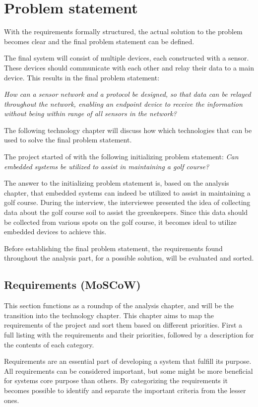 \chapter{Problem statement}
With the requirements formally structured, the actual solution to the problem becomes clear and the final problem statement can be defined.

The final system will consist of multiple devices, each constructed with a sensor. These devices should communicate with each other and relay their data to a main device. This results in the final problem statement:

\textit{How can a sensor network and a protocol be designed, so that data can be relayed throughout the network, enabling an endpoint device to receive the information without being within range of all sensors in the network?}

The following technology chapter will discuss how which technologies that can be used to solve the final problem statement.

The project started of with the following initializing problem statement:
\textit{Can embedded systems be utilized to assist in maintaining a golf course?}

The answer to the initializing problem statement is, based on the analysis chapter, that embedded systems can indeed be utilized to assist in maintaining a golf course. During the interview, the interviewee presented the idea of collecting data about the golf course soil to assist the greenkeepers. Since this data should be collected from various spots on the golf course, it becomes ideal to utilize embedded devices to achieve this.

Before establishing the final problem statement, the requirements found throughout the analysis part, for a possible solution, will be evaluated and sorted.

\section{Requirements (MoSCoW)}
This section functions as a roundup of the analysis chapter, and will be the transition into the technology chapter. This chapter aims to map the requirements of the project and sort them based on different priorities. First a full listing with the requirements and their priorities, followed by a description for the contents of each category.

Requirements are an essential part of developing a system that fulfill its purpose. All requirements can be considered important, but some might be more beneficial for systems core purpose than others. By categorizing the requirements it becomes possible to identify and separate the important criteria from the lesser ones. 

